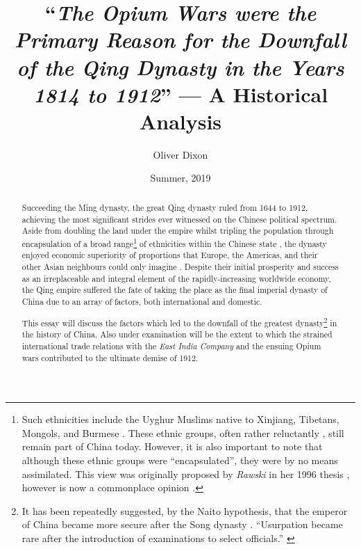 \documentclass[a4paper,oneside]{article}
\title{``\emph{The Opium Wars were the Primary Reason for the Downfall of the Qing Dynasty in the Years 1814 to 1912}'' --- A Historical Analysis}
\author{Oliver Dixon}
\date{Summer, 2019}
\begin{document}
\clearpage\maketitle
\thispagestyle{titlehdr}
\pagestyle{stdhdr}

\vspace*{-1.5em}
\begin{figure}[h!]
	\centering
        \def\svgwidth{0.5\linewidth}
	
\end{figure}
\vspace*{-0.5em}

\begin{abstract}

	Succeeding the Ming dynasty, the great Qing dynasty ruled from 1644 to 1912, achieving the most significant strides ever witnessed on the Chinese political spectrum. Aside from doubling the land under the empire \autocites{Turchin:2006}{Goldstone:1995} whilst tripling the population through encapsulation of a broad range\footnote{Such ethnicities include the Uyghur Muslims native to Xinjiang, Tibetans, Mongols, and Burmese \autocite{Chia:1993}. These ethnic groups, often rather reluctantly \autocites{Teichman:2002}{Smith:2009}{Dwyer:2005}, still remain part of China today. However, it is also important to note that although these ethnic groups were ``encapsulated'', they were by no means assimilated. This view was originally proposed by \textit{Rawski} in her 1996 thesis \autocite{Rawski:1996}, however is now a commonplace opinion \autocite{Hou:2014}.} of ethnicities within the Chinese state \autocite{Rowe:2012}, the dynasty enjoyed economic superiority of proportions that Europe, the Americas, and their other Asian neighbours could only imagine \autocite{Maddison:2007}. Despite their initial prosperity and success as an irreplaceable and integral element of the rapidly-increasing worldwide economy, the Qing empire suffered the fate of taking the place as the final imperial dynasty of China due to an array of factors, both international and domestic.

        This essay will discuss the factors which led to the downfall of the greatest dynasty\footnote{It has been repeatedly suggested, by the Naito hypothesis, that the emperor of China became more secure after the Song dynasty \autocite{Miyakawa:1955}. ``Usurpation became rare after the introduction of examinations to select officials.'' \autocite{Sng:2014}} in the history of China. Also under examination will be the extent to which the strained international trade relations with the \textit{East India Company} and the ensuing Opium wars contributed to the ultimate demise of 1912.

\end{abstract}
\end{document}
